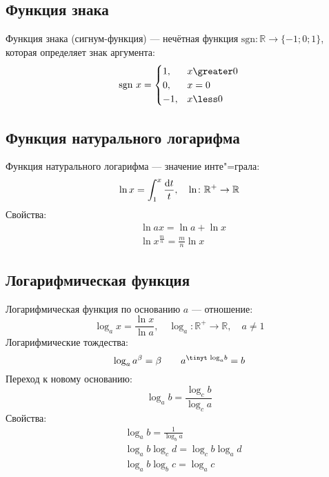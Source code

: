 \subsection{Функция знака}

{\bold Функция знака} {\ital (сигнум-функция)} --- нечётная функция $\text{sgn}\colon
\mathbb{R}\to\{-1;0;1\}$, которая определяет знак аргумента:
$$\sgnn x=\begin{cases}
1, &x\greater 0\\
0, &x=0\\
-1, &x\less 0
\end{cases}$$

\subsection{Функция натурального логарифма}

{\bold Функция натурального логарифма} --- значение инте"=грала:
$$\ln x=\int_1^x\frac{\text{d} t}{t},\quad\ln\colon\mathbb{R}^+\to\mathbb{R}$$
Свойства:
\begin{align*}
&\ln ax=\ln a+\ln x\\
&\ln x^{\frac{m}{n}}=\frac{m}{n}\ln x
\end{align*}

\subsection{Логарифмическая функция}

{\bold Логарифмическая функция} по основанию $a$ --- отношение:
$$\log_ax=\frac{\ln x}{\ln a},\quad\log_a\colon\mathbb{R}^+\to\mathbb{R},\quad a\neq 1$$
Логарифмические тождества:
$$\log_aa^\beta=\beta\qquad a^{\text{\tinyt log}_ab}=b$$
Переход к новому основанию:
$$\log_ab=\frac{\log_cb}{\log_ca}$$
Свойства:
$$\begin{aligned}
&\log_ab=\frac{1}{\log_ba}\\
&\log_ab\log_cd=\log_cb\log_ad\\
&\log_ab\log_bc=\log_ac
\end{aligned}$$
